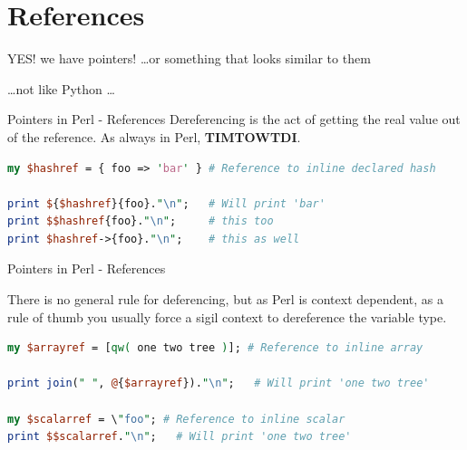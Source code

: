 \documentclass[10pt]{beamer}
\begin{document}
\section{References}

\begin{frame}[standout]
\begin{center}
\huge YES! we have pointers!
\ldots or something that looks similar to them
\end{center}
\begin{center}
\ldots not like Python \ldots
\end{center}
\end{frame}



\begin{frame}[fragile]{Pointers in Perl - References}
Dereferencing is the act of getting the real value out of the reference. \newline
As always in Perl, \textbf{TIMTOWTDI}.
\begin{lstlisting}[language=perl]
my $hashref = { foo => 'bar' } # Reference to inline declared hash

print ${$hashref}{foo}."\n";   # Will print 'bar'
print $$hashref{foo}."\n";     # this too
print $hashref->{foo}."\n";    # this as well
\end{lstlisting}
\end{frame}

\begin{frame}[fragile]{Pointers in Perl - References}


There is no general rule for deferencing, but as Perl is context dependent, as a rule of thumb you usually force a sigil context to dereference the variable type.
\begin{lstlisting}[language=perl]
my $arrayref = [qw( one two tree )]; # Reference to inline array

print join(" ", @{$arrayref})."\n";   # Will print 'one two tree'

my $scalarref = \"foo"; # Reference to inline scalar
print $$scalarref."\n";   # Will print 'one two tree'
\end{lstlisting}

\end{frame}
\end{document}
